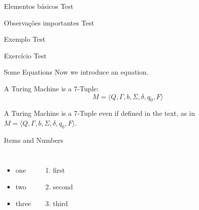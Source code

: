 \documentclass[aspectratio=169]{beamer}
\begin{document}
\begin{frame}[t]{Elementos básicos}
    Test
\end{frame}
\begin{frame}[t]{Observações importantes}
    Test
\end{frame}
\begin{frame}[t]{Exemplo}
    Test
\end{frame}
\begin{frame}[t]{Exercício}
    Test
\end{frame}
\begin{frame}[c]{Some Equations}
Now we introduce an equation.
    \begin{theorem}
    A Turing Machine is a 7-Tuple:
        \begin{equation}
        \label{eq:turi}
            M = \langle Q, \Gamma, b, \Sigma, \delta, q_0, F \rangle
        \end{equation}
    \end{theorem}
A Turing Machine is a 7-Tuple even if defined in the text, as in $M = \langle Q, \Gamma, b, \Sigma, \delta, q_0, F \rangle$.
\end{frame}
\begin{frame}[t]{Items and Numbers}
    \begin{columns}
            \begin{itemize}
                \item one
                \item two
                \item three
            \end{itemize}
            \begin{enumerate}
                \item first
                \item second
                \item third
            \end{enumerate}
    \end{columns}
\end{frame}
\end{document}
